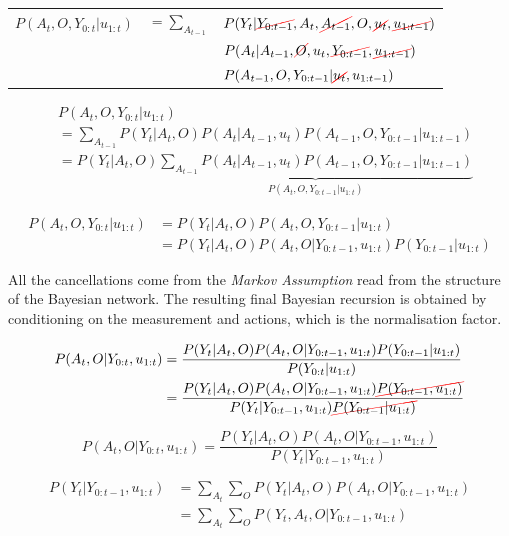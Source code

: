 \begin{tabular}{lll}
   $P(A_t,O,Y_{0:t}|u_{1:t})$ & $=\sum_{A_{t-1}}$ &  $P(Y_t|\Ccancel[red]{Y_{0:t-1}},A_t,\cancel{A_{t-1}},O,\cancel{u_{t}},\cancel{u_{1:t-1}}) $ \\
			      &  & $P(A_t|A_{t-1},\Ccancel[red]{O},u_{t},\Ccancel[red]{Y_{0:t-1}},\Ccancel[red]{u_{1:t-1}}) $ \\
			      &  & $P( A_{t-1},O,Y_{0:t-1}|\Ccancel[red]{u_t},u_{1:t-1})$
\end{tabular}

\begin{align}
  &P(A_t,O,Y_{0:t}|u_{1:t}) \\
  &= \sum_{A_{t-1}} P(Y_t|A_{t},O)  P(A_t|A_{t-1},u_{t})  P(A_{t-1},O,Y_{0:t-1}|u_{1:t-1}) \nonumber \\
  &= P(Y_t|A_{t},O)  \underbrace{\sum_{A_{t-1}} P(A_t|A_{t-1},u_t)  P(A_{t-1},O,Y_{0:t-1}|u_{1:t-1})}_{P(A_t,O,Y_{0:t-1}|u_{1:t})} 
\end{align}

\begin{align}
   P(A_t,O,Y_{0:t}|u_{1:t}) &= P(Y_t|A_{t},O)  P(A_t,O,Y_{0:t-1}|u_{1:t}) \nonumber \\
			    &= P(Y_t|A_{t},O)  P(A_t,O|Y_{0:t-1},u_{1:t})  P(Y_{0:t-1}|u_{1:t})
\end{align}


All the cancellations come from the \textit{Markov Assumption} read from the structure of the Bayesian network.
The resulting final Bayesian recursion is obtained by conditioning on the measurement and actions, which is the normalisation factor.

\begin{align}\label{eq:ch5_measurement_update}
 P(A_t,O|Y_{0:t},u_{1:t}) &= \frac{P(Y_t|A_{t},O)  P(A_t,O|Y_{0:t-1},u_{1:t})  P(Y_{0:t-1}|u_{1:t})}{P(Y_{0:t}|u_{1:t})} \nonumber \\
			  &= \frac{P(Y_t|A_{t},O)  P(A_t,O|Y_{0:t-1},u_{1:t})  \Ccancel[red]{P(Y_{0:t-1},u_{1:t})}}{P(Y_t|Y_{0:t-1},u_{1:t}) \Ccancel[red]{P(Y_{0:t-1}|u_{1:t})}}  
\end{align}
 
\begin{equation}
   P(A_t,O|Y_{0:t},u_{1:t}) = \frac{P(Y_t|A_{t},O) P(A_{t},O|Y_{0:t-1},u_{1:t})}{P(Y_t|Y_{0:t-1},u_{1:t})} 
\end{equation}


\begin{align}
 P(Y_t|Y_{0:t-1},u_{1:t}) &= \sum\limits_{A_t} \sum\limits_O  P(Y_t|A_{t},O) P(A_{t},O|Y_{0:t-1},u_{1:t}) \\
			  &= \sum\limits_{A_t} \sum\limits_O  P(Y_t,A_{t},O|Y_{0:t-1},u_{1:t})
\end{align}

